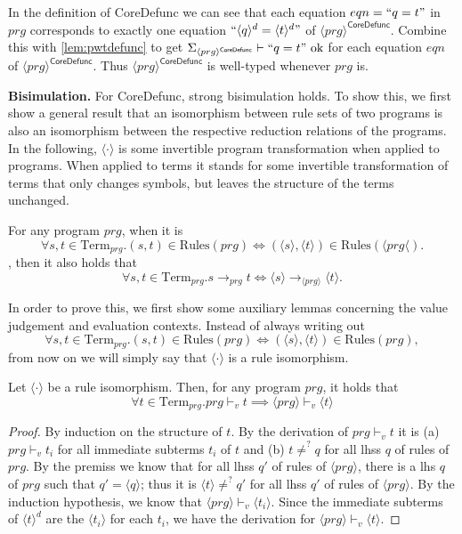 In the definition of \textsf{CoreDefunc} we can see that each equation $eqn = `` q = t "$ in $prg$ corresponds to exactly one equation $`` \langle q \rangle^d = \langle t \rangle^d "$ of $\langle prg \rangle^{\textsf{CoreDefunc}}$. Combine this with \autoref{lem:pwtdefunc} to get $\Sigma_{\langle prg \rangle^{\textsf{CoreDefunc}}} \vdash `` q = t " \textrm{ ok}$ for each equation $eqn$ of $\langle prg \rangle^{\textsf{CoreDefunc}}$. Thus $\langle prg \rangle^{\textsf{CoreDefunc}}$ is well-typed whenever $prg$ is.

\textbf{Bisimulation.} For \textsf{CoreDefunc}, strong bisimulation holds. To show this, we first show a general result that an isomorphism between rule sets of two programs is also an isomorphism between the respective reduction relations of the programs. In the following, $\langle \cdot \rangle$ is some invertible program transformation when applied to programs. When applied to terms it stands for some invertible transformation of terms that only changes symbols, but leaves the structure of the terms unchanged.

\begin{lemma}
\label{lem:iso}
For any program $prg$, when it is
\[
\forall s,t \in \textrm{Term}_{prg}. (s, t) \in \textrm{Rules}(prg) \iff (\langle s \rangle, \langle t \rangle) \in \textrm{Rules}(\langle prg \langle).
\]
, then it also holds that
\[
\forall s,t \in \textrm{Term}_{prg}. s \longrightarrow_{prg} t \iff \langle s \rangle \longrightarrow_{\langle prg \rangle} \langle t \rangle.
\]
\end{lemma}

In order to prove this, we first show some auxiliary lemmas concerning the value judgement and evaluation contexts. Instead of always writing out
\[
\forall s,t \in \textrm{Term}_{prg}. (s, t) \in \textrm{Rules}(prg) \iff (\langle s \rangle, \langle t \rangle) \in \textrm{Rules}(prg),
\]
from now on we will simply say that $\langle \cdot \rangle$ is a rule isomorphism.

\begin{lemma}
\label{lem:ivj}
Let $\langle \cdot \rangle$ be a rule isomorphism. Then, for any program $prg$, it holds that
\[
\forall t \in \textrm{Term}_{prg}. prg \vdash_v t \implies \langle prg \rangle \vdash_v \langle t \rangle
\]
\begin{proof}
By induction on the structure of $t$. By the derivation of $prg \vdash_v t$ it is (a) $prg \vdash_v t_i$ for all immediate subterms $t_i$ of $t$ and (b) $t \neq^? q$ for all lhss $q$ of rules of $prg$. By the premiss we know that for all lhss $q'$ of rules of $\langle prg \rangle$, there is a lhs $q$ of $prg$ such that $q' = \langle q \rangle$; thus it is $\langle t \rangle \neq^? q'$ for all lhss $q'$ of rules of $\langle prg \rangle$. By the induction hypothesis, we know that $\langle prg \rangle \vdash_v \langle t_i \rangle$. Since the immediate subterms of $\langle t \rangle^d$ are the $\langle t_i \rangle$ for each $t_i$, we have the derivation for $\langle prg \rangle \vdash_v \langle t \rangle$.
\end{proof}
\end{lemma}

